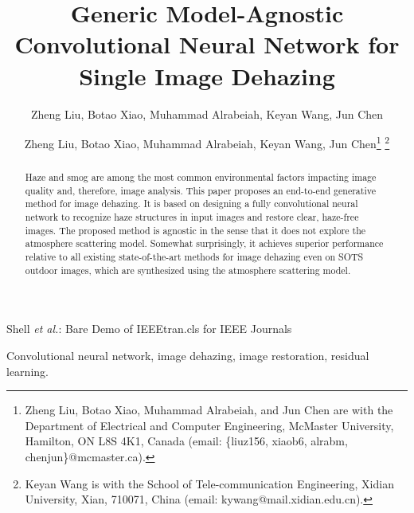 \documentclass[journal]{IEEEtran}
\begin{document}
\title{Generic Model-Agnostic Convolutional Neural Network for Single Image Dehazing}

\author{Zheng Liu,
		Botao Xiao,
		Muhammad Alrabeiah,
		Keyan Wang,
        Jun Chen
}

\author{Zheng Liu, Botao Xiao, Muhammad Alrabeiah, Keyan Wang, Jun Chen\thanks{ Zheng Liu, Botao Xiao, Muhammad Alrabeiah, and Jun Chen are with the Department of Electrical and Computer Engineering, McMaster University, Hamilton, ON L8S 4K1, Canada (email: \{liuz156, xiaob6, alrabm, chenjun\}@mcmaster.ca).} \thanks{Keyan Wang is with the School of Tele-communication Engineering, Xidian University, Xian, 710071, China (email: kywang@mail.xidian.edu.cn).}}



%
{Shell \MakeLowercase{\textit{et al.}}: Bare Demo of IEEEtran.cls for IEEE Journals}











\maketitle

\begin{abstract}
Haze and smog are among the most common environmental factors impacting image quality and, therefore, image analysis. This paper proposes an end-to-end generative method for image dehazing. It is based on designing a fully convolutional neural network to recognize haze structures in input images and restore clear, haze-free images. The proposed method is agnostic in the sense that it does not explore the atmosphere scattering model. Somewhat surprisingly, it achieves superior performance relative to all existing state-of-the-art methods for image dehazing even on SOTS outdoor images, which are synthesized using the atmosphere scattering model.
\end{abstract}

\begin{IEEEkeywords}
Convolutional neural network, image dehazing, image restoration,  residual learning.
\end{IEEEkeywords}






\IEEEpeerreviewmaketitle
\end{document}
